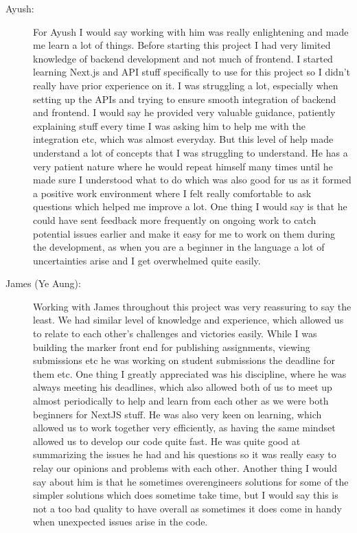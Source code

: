\documentclass[a4paper, 12pt]{article}
\begin{document}
\begin{enumerate}
\begin{description}
            \item[Ayush: ] For Ayush I would say working with him was really enlightening and made me learn a lot of things. Before starting this project I had very limited knowledge of backend development and not much of frontend. I started learning Next.js and API stuff specifically to use for this project so I didn’t really have prior experience on it. I was struggling a lot, especially when setting up the APIs and trying to ensure smooth integration of backend and frontend. I would say he provided very valuable guidance, patiently explaining stuff every time I was asking him to help me with the integration etc, which was almost everyday. But this level of help made understand a lot of concepts that I was struggling to understand. He has a very patient nature where he would repeat himself many times until he made sure I understood what to do which was also good for us as it formed a positive work environment where I felt really comfortable to ask questions which helped me improve a lot. One thing I would say is that he could have sent feedback more frequently on ongoing work to catch potential issues earlier and make it easy for me to work on them during the development, as when you are a beginner in the language a lot of uncertainties arise and I get overwhelmed quite easily.
            \item[James (Ye Aung): ] Working with James throughout this project was very reassuring to say the least. We had similar level of knowledge and experience, which allowed us to relate to each other’s challenges and victories easily. While I was building the marker front end for publishing assignments, viewing submissions etc he was working on student submissions the deadline for them etc. One thing I greatly appreciated was his discipline, where he was always meeting his deadlines, which also allowed both of us to meet up almost periodically to help and learn from each other as we were both beginners for NextJS stuff. He was also very keen on learning, which allowed us to work together very efficiently, as having the same mindset allowed us to develop our code quite fast. He was quite good at summarizing the issues he had and his questions so it was really easy to relay our opinions and problems with each other. Another thing I would say about him is that he sometimes overengineers solutions for some of the simpler solutions which does sometime take time, but I would say this is not a too bad quality to have overall as sometimes it does come in handy when unexpected issues arise in the code.
        \end{description}
\end{enumerate}
\end{document}
